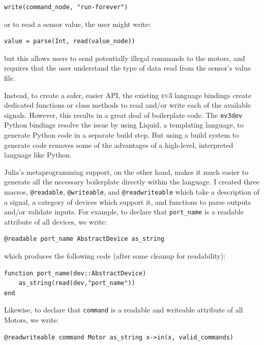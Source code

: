 \documentclass[]{article}
\newcommand{\ev}{\textsc{ev3}}
\begin{document}
\begin{verbatim}
write(command_node, "run-forever")
\end{verbatim}

or to read a sensor value, the user might write:

\begin{verbatim}
value = parse(Int, read(value_node))
\end{verbatim}

but this allows users to send potentially illegal commands to the motors, and requires that the user understand the type of data read from the sensor's value file. 

Instead, to create a safer, easier API, the existing \ev{} language bindings create dedicated functions or class methods to read and/or write each of the available signals. However, this results in a great deal of boilerplate code. The \texttt{ev3dev} Python bindings resolve the issue by using Liquid, a templating language, to generate Python code in a separate build step. But using a build system to generate code removes some of the advantages of a high-level, interpreted language like Python. 

Julia's metaprogramming support, on the other hand, makes it much easier to generate all the necessary boilerplate directly within the language. I created three macros, \texttt{@readable}, \texttt{@writeable}, and \texttt{@readwriteable} which take a description of a signal, a category of devices which support it, and functions to parse outputs and/or validate inputs. For example, to declare that \texttt{port\_name} is a readable attribute of all devices, we write:

\begin{verbatim}
@readable port_name AbstractDevice as_string
\end{verbatim}

which produces the following code (after some cleanup for readability):

\begin{verbatim}
function port_name(dev::AbstractDevice) 
    as_string(read(dev,"port_name"))
end
\end{verbatim}

Likewise, to declare that \texttt{command} is a readable and writeable attribute of all Motors, we write:

\begin{verbatim}
@readwriteable command Motor as_string x->in(x, valid_commands)
\end{verbatim}
\end{document}
